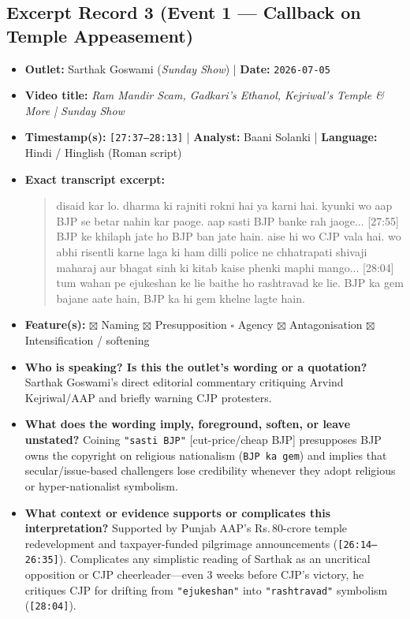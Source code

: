 \documentclass[10pt,a4paper]{article}
\begin{document}
\subsection*{Excerpt Record 3 (Event 1 --- Callback on Temple Appeasement)}
\begin{itemize}[leftmargin=1.5em, itemsep=3pt, topsep=4pt]
  \item \textbf{Outlet:} Sarthak Goswami (\textit{Sunday Show}) | \textbf{Date:} \texttt{2026-07-05}
  \item \textbf{Video title:} \textit{Ram Mandir Scam, Gadkari's Ethanol, Kejriwal's Temple \& More | Sunday Show}
  \item \textbf{Timestamp(s):} \texttt{[27:37--28:13]} | \textbf{Analyst:} Baani Solanki | \textbf{Language:} Hindi / Hinglish (Roman script)
  \item \textbf{Exact transcript excerpt:}
    \begin{quote}\small\ttfamily [27:37] disaid kar lo. dharma ki rajniti rokni hai ya karni hai. kyunki wo aap BJP se betar nahin kar paoge. aap sasti BJP banke rah jaoge... [27:55] BJP ke khilaph jate ho BJP ban jate hain. aise hi wo CJP vala hai. wo abhi risentli karne laga ki ham dilli police ne chhatrapati shivaji maharaj aur bhagat sinh ki kitab kaise phenki maphi mango... [28:04] tum wahan pe ejukeshan ke lie baithe ho rashtravad ke lie. BJP ka gem bajane aate hain, BJP ka hi gem khelne lagte hain.\end{quote}
  \item \textbf{Feature(s):} $\boxtimes$ Naming $\boxtimes$ Presupposition $\square$ Agency $\boxtimes$ Antagonisation $\boxtimes$ Intensification / softening
  \item \textbf{Who is speaking? Is this the outlet's wording or a quotation?} Sarthak Goswami's direct editorial commentary critiquing Arvind Kejriwal/AAP and briefly warning CJP protesters.
  \item \textbf{What does the wording imply, foreground, soften, or leave unstated?} Coining \texttt{"sasti BJP"} [cut-price/cheap BJP] presupposes BJP owns the copyright on religious nationalism (\texttt{BJP ka gem}) and implies that secular/issue-based challengers lose credibility whenever they adopt religious or hyper-nationalist symbolism.
  \item \textbf{What context or evidence supports or complicates this interpretation?} Supported by Punjab AAP's Rs.\,80-crore temple redevelopment and taxpayer-funded pilgrimage announcements (\texttt{[26:14--26:35]}). Complicates any simplistic reading of Sarthak as an uncritical opposition or CJP cheerleader---even 3 weeks before CJP's victory, he critiques CJP for drifting from \texttt{"ejukeshan"} into \texttt{"rashtravad"} symbolism (\texttt{[28:04]}).

\end{itemize}
\end{document}
